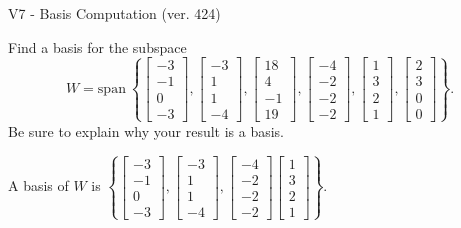 \begin{exercise}
  \begin{exerciseTitle}V7 - Basis Computation (ver. 424)\end{exerciseTitle}
  \begin{exerciseStatement}
    Find a basis for the subspace 
\[W=\mathrm{span}\ \left\{\left[\begin{array}{r}
-3 \\
-1 \\
0 \\
-3
\end{array}\right] , \left[\begin{array}{r}
-3 \\
1 \\
1 \\
-4
\end{array}\right] , \left[\begin{array}{r}
18 \\
4 \\
-1 \\
19
\end{array}\right] , \left[\begin{array}{r}
-4 \\
-2 \\
-2 \\
-2
\end{array}\right] , \left[\begin{array}{r}
1 \\
3 \\
2 \\
1
\end{array}\right] , \left[\begin{array}{r}
2 \\
3 \\
0 \\
0
\end{array}\right]\right\}.\]
 Be sure to explain why your result is a basis.


  \end{exerciseStatement}
  \begin{exerciseAnswer}
   A basis of \(W\) is  \(\left\{\left[\begin{array}{r}
-3 \\
-1 \\
0 \\
-3
\end{array}\right] , \left[\begin{array}{r}
-3 \\
1 \\
1 \\
-4
\end{array}\right] , \left[\begin{array}{r}
-4 \\
-2 \\
-2 \\
-2
\end{array}\right] \left[\begin{array}{r}
1 \\
3 \\
2 \\
1
\end{array}\right]\right\}\).
  


  \end{exerciseAnswer}
\end{exercise}